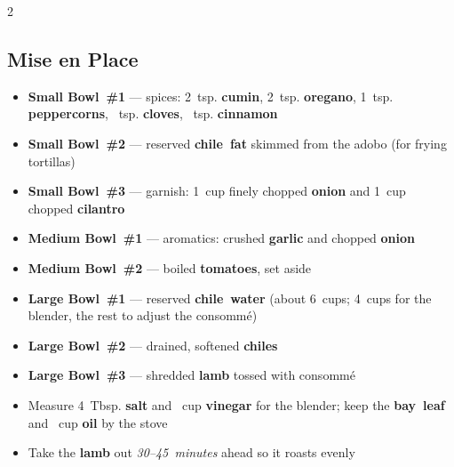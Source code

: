 \documentclass[11pt,letterpaper]{article}
\begin{document}
{\begin{multicols}{2}
\subsection*{Mise en Place}
\begin{itemize}
    \item \textbf{Small Bowl~\#1} --- spices: 2~tsp. \textbf{cumin}, 2~tsp. \textbf{oregano}, 1~tsp. \textbf{peppercorns}, ~tsp. \textbf{cloves}, ~tsp. \textbf{cinnamon}
    \item \textbf{Small Bowl~\#2} --- reserved \textbf{chile~fat} skimmed from the adobo (for frying tortillas)
    \item \textbf{Small Bowl~\#3} --- garnish: 1~cup finely chopped \textbf{onion} and 1~cup chopped \textbf{cilantro}
    \item \textbf{Medium Bowl~\#1} --- aromatics: crushed \textbf{garlic} and chopped \textbf{onion}
    \item \textbf{Medium Bowl~\#2} --- boiled \textbf{tomatoes}, set aside
    \item \textbf{Large Bowl~\#1} --- reserved \textbf{chile~water} (about 6~cups; 4~cups for the blender, the rest to adjust the consommé)
    \item \textbf{Large Bowl~\#2} --- drained, softened \textbf{chiles}
    \item \textbf{Large Bowl~\#3} --- shredded \textbf{lamb} tossed with consommé
    \item Measure 4~Tbsp. \textbf{salt} and ~cup \textbf{vinegar} for the blender; keep the \textbf{bay~leaf} and ~cup \textbf{oil} by the stove
    \item Take the \textbf{lamb} out \textit{30--45~minutes} ahead so it roasts evenly
\end{itemize}


\end{multicols}}
\end{document}
